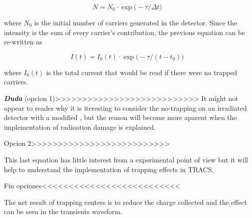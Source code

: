\[N = N_0 \cdot \exp{\big(- \tau/\Delta t} \big)\]

where $N_0$ is the initial number of carriers generated in the detector. Since the intensity is the sum of every carrier's contribution, the previous equation can be re-written as

\begin{equation}
	I(t) = I_0(t) \cdot \exp{\big(-\tau / (t-t_0)\big)}
 \label{eq:trapCurr}
\end{equation}

where $I_0(t)$ is the total current that would be read if there were no trapped carriers. 

\textbf{\emph{Duda}}
(opcion 1)>>>>>>>>>>>>>>>>>>>>>>>>>>>
It might not appear to reader why it is iteresting to consider the no-trapping on an irradiated detector with a modified \neff, but the reason will become more aparent when the implementation of radioation damage is explained. 

Opcion 2>>>>>>>>>>>>>>>>>>>>>>>>>>

This last equation has little interest from a experimental point of view but it will help to understand the implementation of trapping effects in TRACS. 

Fin opciones<<<<<<<<<<<<<<<<<<<<<<<<<<

The net result of trapping centers is to reduce the charge collected and the effect can be seen in the transients waveform.

